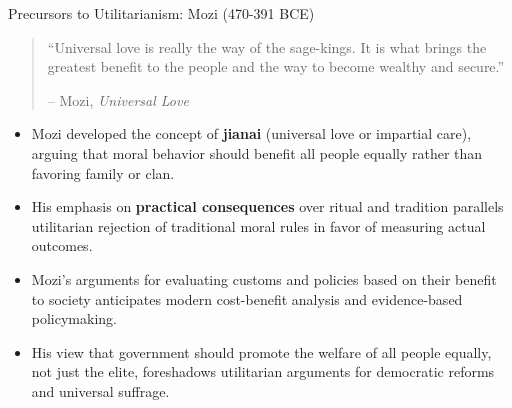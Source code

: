 \documentclass[aspectratio=169]{beamer}
\begin{document}
\begin{frame}{Precursors to Utilitarianism: Mozi (470-391 BCE)}
    \begin{quote}
        ``Universal love is really the way of the sage-kings. It is what brings the greatest benefit to the people and the way to become wealthy and secure.''
        \vspace{0.5em}
        
        -- Mozi, \textit{Universal Love}
    \end{quote}
    \begin{itemize}
        \item Mozi developed the concept of \textbf{jianai} (universal love or impartial care), arguing that moral behavior should benefit all people equally rather than favoring family or clan.
        
        \item His emphasis on \textbf{practical consequences} over ritual and tradition parallels utilitarian rejection of traditional moral rules in favor of measuring actual outcomes.
        
        \item Mozi's arguments for evaluating customs and policies based on their benefit to society anticipates modern cost-benefit analysis and evidence-based policymaking.
        
        \item His view that government should promote the welfare of all people equally, not just the elite, foreshadows utilitarian arguments for democratic reforms and universal suffrage.
    \end{itemize}
\end{frame}
\end{document}
